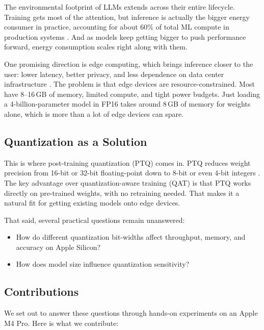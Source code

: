 \documentclass[11pt,a4paper]{article}
\begin{document}
The environmental footprint of LLMs extends across their entire lifecycle. Training gets most of the attention, but inference is actually the bigger energy consumer in practice, accounting for about 60\% of total ML compute in production systems \cite{patterson2021carbon}. And as models keep getting bigger to push performance forward, energy consumption scales right along with them.

One promising direction is edge computing, which brings inference closer to the user: lower latency, better privacy, and less dependence on data center infrastructure \cite{shi2016edge}. The problem is that edge devices are resource-constrained. Most have 8--16\,GB of memory, limited compute, and tight power budgets. Just loading a 4-billion-parameter model in FP16 takes around 8\,GB of memory for weights alone, which is more than a lot of edge devices can spare.

\subsection{Quantization as a Solution}

This is where post-training quantization (PTQ) comes in. PTQ reduces weight precision from 16-bit or 32-bit floating-point down to 8-bit or even 4-bit integers \cite{han2015deep}. The key advantage over quantization-aware training (QAT) is that PTQ works directly on pre-trained weights, with no retraining needed. That makes it a natural fit for getting existing models onto edge devices.

That said, several practical questions remain unanswered:

\begin{itemize}[leftmargin=*,nosep]
    \item How do different quantization bit-widths affect throughput, memory, and accuracy on Apple Silicon?
    \item How does model size influence quantization sensitivity?
\end{itemize}

\subsection{Contributions}

We set out to answer these questions through hands-on experiments on an Apple M4 Pro. Here is what we contribute:
\end{document}
